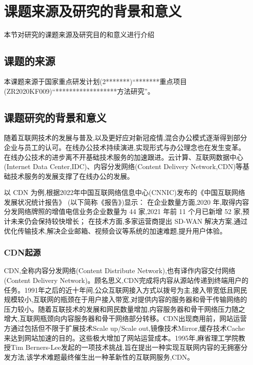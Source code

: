 
\section{课题来源及研究的背景和意义}
	本节对研究的课题来源及研究目的和意义进行介绍
\subsection{课题的来源}
本课题来源于国家重点研发计划(2*******)“*******重点项目(ZR2020KF009)“******************方法研究”。
\subsection{课题研究的背景和意义}

随着互联网技术的发展与普及,以及更好应对新冠疫情,混合办公模式逐渐得到部分企业与员工的认可。在线办公技术持续演进,实现形式与办公理念也在发生变革。
在线办公技术的进步离不开基础技术服务的加速跟进。云计算、互联网数据中心(Internet Data Center,IDC)、内容分发网络(Content Delivery Network,CDN)等基础技术服务的发展支撑了在线办公的发展。

以 CDN 为例,根据2022年中国互联网络信息中心(CNNIC)发布的《中国互联网络发展状况统计报告》\cite{cnnic2022} (以下简称《报告》)显示：
在企业数量方面,2020 年,取得内容分发网络牌照的增值电信业务企业数量为 44 家,2021 年前 11 个月已新增 52 家,预计未来仍会保持较快增长；
在技术方面,多家运营商提出 SD-WAN 解决方案,通过优化传输技术,解决企业邮箱、视频会议等系统的加速难题,提升用户体验。


\subsubsection{CDN起源}

CDN,全称内容分发网络(Content Distribute Network),也有译作内容交付网络(Content Delivery Network)。顾名思义,CDN完成将内容从源站传递到终端用户的任务。1991年之后的近十年间,公众互联网接入方式以拨号为主,接入带宽低且网民规模较小,互联网的瓶颈在于用户接入带宽,对提供内容的服务器和骨干传输网络的压力较小。随着互联技术的发展和网民数量增加,内容服务器和骨干网络压力随之增大,互联网瓶颈向内容服务器和骨干网络部分转移。CDN出现商用前，网站运营方通过包括但不限于扩展技术Scale up/Scale out,镜像技术Mirror,缓存技术Cache来达到网站加速的目的。这些极大增加了网站运营成本。1995年,麻省理工学院教授Tim Berners-Lee发起的一项技术挑战,旨在提出一种实现互联网内容的无拥塞分发方法,该学术难题最终催生出一种革新性的互联网服务,CDN。

